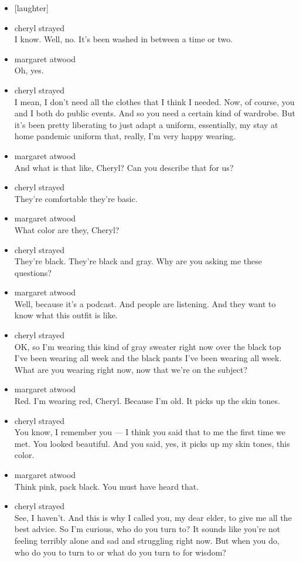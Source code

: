 \begin{itemize}
\item
  {[}laughter{]}
\item
  cheryl strayed\\
  I know. Well, no. It's been washed in between a time or two.
\item
  margaret atwood\\
  Oh, yes.
\item
  cheryl strayed\\
  I mean, I don't need all the clothes that I think I needed. Now, of
  course, you and I both do public events. And so you need a certain
  kind of wardrobe. But it's been pretty liberating to just adapt a
  uniform, essentially, my stay at home pandemic uniform that, really,
  I'm very happy wearing.
\item
  margaret atwood\\
  And what is that like, Cheryl? Can you describe that for us?
\item
  cheryl strayed\\
  They're comfortable they're basic.
\item
  margaret atwood\\
  What color are they, Cheryl?
\item
  cheryl strayed\\
  They're black. They're black and gray. Why are you asking me these
  questions?
\item
  margaret atwood\\
  Well, because it's a podcast. And people are listening. And they want
  to know what this outfit is like.
\item
  cheryl strayed\\
  OK, so I'm wearing this kind of gray sweater right now over the black
  top I've been wearing all week and the black pants I've been wearing
  all week. What are you wearing right now, now that we're on the
  subject?
\item
  margaret atwood\\
  Red. I'm wearing red, Cheryl. Because I'm old. It picks up the skin
  tones.
\item
  cheryl strayed\\
  You know, I remember you --- I think you said that to me the first
  time we met. You looked beautiful. And you said, yes, it picks up my
  skin tones, this color.
\item
  margaret atwood\\
  Think pink, pack black. You must have heard that.
\item
  cheryl strayed\\
  See, I haven't. And this is why I called you, my dear elder, to give
  me all the best advice. So I'm curious, who do you turn to? It sounds
  like you're not feeling terribly alone and sad and struggling right
  now. But when you do, who do you to turn to or what do you turn to for
  wisdom?


\end{itemize}
